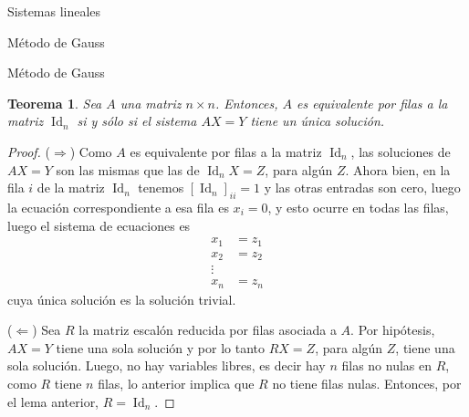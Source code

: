 \documentclass[a4paper,12pt,twoside,spanish,reqno]{amsbook}
\newtheorem{teorema}{Teorema}[section]
\theoremstyle{definition}
\theoremstyle{remark}
\newcommand{\Id}{\operatorname{Id}}
\begin{document}
\begin{chapter}{Sistemas lineales}
\begin{section}{Método de Gauss }
\begin{subsection}{Método de Gauss}
				\begin{teorema}
					Sea $A$ una matriz $n \times n$. Entonces, $A$ es equivalente por filas a la matriz $\Id_n$  si y sólo si el sistema $AX = Y$ tiene un única solución. 
				\end{teorema}
				\begin{proof}
					($\Rightarrow$) Como $A$ es equivalente por filas a la matriz $\Id_n$, las soluciones de $AX =Y$ son las mismas que las de $\Id_nX=Z$, para algún $Z$. Ahora bien,  en la fila $i$ de la matriz $\Id_n$ tenemos $[\Id_n]_{ii} =1$ y las otras entradas son cero, luego la ecuación correspondiente a esa fila es $x _i =0$, y esto ocurre en todas las filas, luego el sistema de ecuaciones es
					\begin{align*}
					x_1 &=z_1 \\ x_2 &= z_2 \\ \vdots \\ x_n &= z_n
					\end{align*}
					cuya única solución es la solución trivial.
					
					($\Leftarrow$) Sea $R$ la matriz escalón reducida por filas asociada a $A$. Por hipótesis, $AX=Y$ tiene una sola solución y  por lo tanto $RX=Z$, para algún $Z$, tiene una sola solución. Luego, no hay variables libres, es decir hay $n$ filas no nulas en $R$, como $R$ tiene $n$ filas, lo anterior implica que $R$ no tiene filas nulas. Entonces, por el lema anterior, $R=\Id_n$.
				\end{proof}
			\end{subsection}
			
			
			

\end{section}
\end{chapter}
\end{document}
